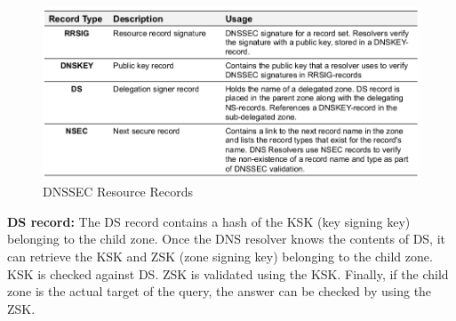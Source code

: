 \documentclass[11pt,oneside,a4paper]{article}
\begin{document}
\begin{figure}[hb]
	\centering
	\includegraphics[width=0.8\linewidth]{figures/dnssec_resource_records}
	\caption{DNSSEC Resource Records}
	\label{fig:dnssecresourcerecords}
\end{figure}

\noindent \textbf{DS record:} The DS record contains a hash of the KSK (key signing key) belonging to the
child zone. Once the DNS resolver knows the contents of DS, it can retrieve the KSK and ZSK (zone
signing key) belonging to the child zone. KSK is checked against DS. ZSK is validated using
the KSK. Finally, if the child zone is the actual target of the query, the answer
can be checked by using the ZSK.






\label{lastpage} %
\clearpage
{}



\clearpage
\appendix
{}
\end{document}
